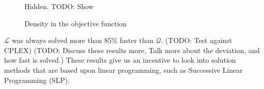 \begin{figure}[h!]
\begin{center}
    Hidden. TODO: Show
%    
\end{center}
\caption{Density in the objective function}
\label{fig:sparsobj}
\end{figure}

$\mathcal{L}$ was always solved more than 85\% faster than $\mathcal{Q}$.
(TODO: Test against CPLEX)
(TODO: Discuss these results more, Talk more about the deviation, and how fast
is solved.)
These results give us an incentive to look into solution methods that are based
upon linear programming, such as Successive Linear Programming (SLP).
